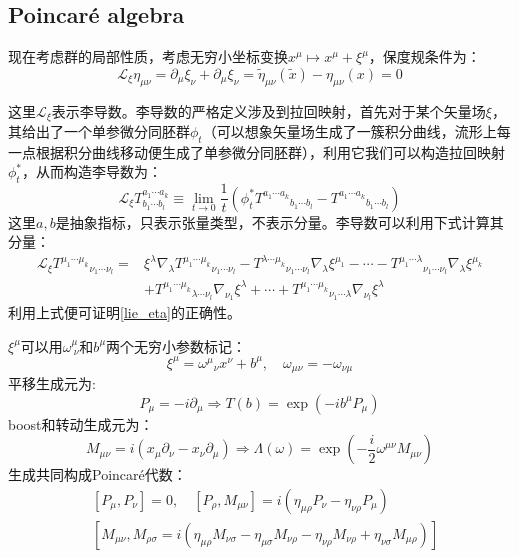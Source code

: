 \subsection{Poincar\'e algebra}
现在考虑群的局部性质，考虑无穷小坐标变换$x^\mu\mapsto x^\mu+\xi^\mu$，保度规条件为：
\begin{equation}\label{lie_eta}
	\mathscr{L}_\xi\eta_{\mu\nu}=\partial_\mu\xi_\nu+\partial_\mu\xi_\nu=\tilde{\eta}_{\mu\nu}(\tilde x)-\eta_{\mu\nu}(x)=0
\end{equation}
\begin{remark}
	这里$\mathscr{L}_\xi$表示李导数。李导数的严格定义涉及到拉回映射，首先对于某个矢量场$\xi$，其给出了一个单参微分同胚群$\phi_t$（可以想象矢量场生成了一簇积分曲线，流形上每一点根据积分曲线移动便生成了单参微分同胚群），利用它我们可以构造拉回映射$\phi_t^*$，从而构造李导数为：
	\[\mathscr{L}_{\xi}T^{{a_1\cdots a_k}}_{b_1\cdots b_l}\equiv\lim_{t\to0}\frac{1}{t}\left(\phi_t^*{T^{a_1\cdots a_k}}_{b_1\cdots b_l}-{T^{a_1\cdots a_k}}_{b_1\cdots b_l}\right)\]
	这里$a,b$是抽象指标，只表示张量类型，不表示分量。李导数可以利用下式计算其分量：
	\begin{equation}
		\begin{aligned}
			\mathscr{L}_{\xi}{T^{\mu_1\cdots \mu_k}}_{\nu_1\cdots\nu_l}=&\xi^\lambda\nabla_\lambda{T^{\mu_1\cdots \mu_k}}_{\nu_1\cdots\nu_l}-{T^{\lambda\cdots \mu_k}}_{\nu_1\cdots\nu_l}\nabla_\lambda\xi^{\mu_1}-\cdots-{T^{\mu_1\cdots \lambda}}_{\nu_1\cdots\nu_l}\nabla_\lambda\xi^{\mu_k}\\
			&+{T^{\mu_1\cdots \mu_k}}_{\lambda\cdots\nu_l}\nabla_{\nu_1}\xi^{\lambda}+\cdots+{T^{\mu_1\cdots \mu_k}}_{\nu_1\cdots\lambda}\nabla_{\nu_l}\xi^{\lambda}
		\end{aligned}		
	\end{equation}
	利用上式便可证明\ref{lie_eta}的正确性。
\end{remark}
$\xi^\mu$可以用$\omega_{\ \nu}^\mu$和$b^\mu$两个无穷小参数标记：
\[\xi^\mu={\omega^\mu}_\nu x^\nu+b^\mu,\quad \omega_{\mu\nu}=-\omega_{\nu\mu}\]
平移生成元为:
\[P_\mu=-i\partial_\mu\Rightarrow T(b)=\exp(-i b^\mu P_\mu)\]
boost和转动生成元为：
\[M_{\mu\nu}=i\left(x_\mu\partial_\nu-x_\nu\partial_\mu\right)\Rightarrow \Lambda(\omega)=\exp(-\frac{i}{2} \omega^{\mu\nu} M_{\mu\nu})\]
生成共同构成Poincar\'e代数：
\begin{equation}
	\begin{aligned}
		&[P_\mu,P_\nu]=0,\quad[P_\rho,M_{\mu\nu}]=i(\eta_{\mu\rho}P_\nu-\eta_{\nu\rho} P_\mu)\\
		&[M_{\mu\nu},M_{\rho\sigma}=i\left(\eta_{\mu\rho}M_{\nu\sigma}-\eta_{\mu\sigma}M_{\nu\rho}-\eta_{\nu\rho}M_{\nu\rho}+\eta_{\nu\sigma}M_{\mu\rho}\right)]
	\end{aligned}
\end{equation}

